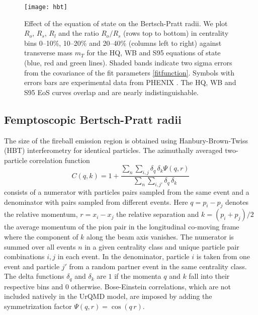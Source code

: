 \documentclass[aps,prc,reprint,amsmath,nofootinbib,superscriptaddress]{revtex4-1}
\begin{document}
\begin{figure*}[t]
  \texttt{[image: hbt]}
  \caption{
    \label{fig:hbt} Effect of the equation of state on the Bertsch-Pratt radii. We plot $R_o$, $R_s$, $R_l$ and the ratio $R_o/R_s$ (rows top to bottom) 
    in centrality bins 0--10\%, 10--20\% and 20--40\% (columns left to right) against transverse mass $m_T$ for the HQ, WB and S95 equations of state 
    (blue, red and green lines). Shaded bands indicate two sigma errors from the covariance of the fit parameters \eqref{fitfunction}. Symbols with errors bars 
    are experimental data from PHENIX \cite{Adare:2015bcj}. The HQ, WB and S95 EoS curves overlap and are nearly indistinguishable.
  }
\end{figure*}

\subsection{Femptoscopic Bertsch-Pratt radii}
\label{hbt}

The size of the fireball emission region is obtained using Hanbury-Brown-Twiss (HBT) interferometry for identical particles. The azimuthally averaged two-particle correlation function 
\begin{equation}
 \label{c2}
 C(q, k) = 1 + \frac{\sum\limits_n \sum\limits_{i, j} \delta_{q} \, \delta_{k}\Psi(q,r)}{\sum\limits_{n} \sum\limits_{i,j'} \delta_{q} \, \delta_{k}}
\end{equation}
consists of a numerator with particles pairs sampled from the same event and a denominator with pairs sampled from different events. Here $q = p_i - p_j$ denotes the relative momentum, $r=x_i-x_j$ the relative separation and $k = (p_i + p_j)/2$ the average momentum of the pion pair in the longitudinal co-moving 
frame where the component of $k$ along the beam axis vanishes. The numerator is summed over all events $n$ in a given centrality class and unique particle pair combinations $i,j$ in each event. In the denominator, particle $i$ is
taken from one event and particle $j'$ from a random partner event in the same centrality class. The delta functions $\delta_q$ and $\delta_k$ are $1$ if the momenta $q$ and $k$ fall into their respective bins and $0$ otherwise. Bose-Einstein 
correlations, which are not included natively in the UrQMD model, are imposed by adding the symmetrization factor $\Psi(q,r) = \cos(q\,r)$. 
\end{document}
